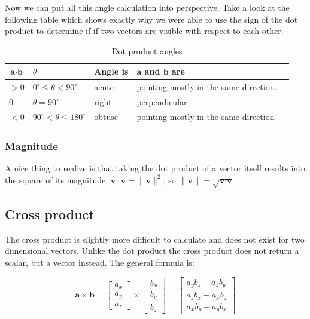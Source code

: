 \documentclass[a4paper,11pt]{article}
\begin{document}
Now we can put all this angle calculation into perspective. Take a look at the following table which shows exactly why we were able to use the sign of the dot product to determine if if two vectors are visible with respect to each other.

\begin{table}[H]
\centering
\begin{tabular}{|l|l|l|l|l|}
\hline
$\textbf{a}\cdot\textbf{b}$ & $\theta$ & \textbf{Angle is} & $\textbf{a}$ \textbf{and} $\textbf{b}$ \textbf{are}  \\ \hline
$>0$ & $0^\circ \leq \theta < 90^\circ$ & acute & pointing mostly in the same direction. \\ \hline
$0$ & $\theta=90^\circ$ & right & perpendicular \\ \hline
$<0$ & $90^\circ < \theta \leq 180^\circ$ & obtuse & pointing mostly in the same direction \\ \hline
\end{tabular}
\caption{Dot product angles}
\label{tab:dot-product-angles}
\end{table}

\subsubsection{Magnitude}

A nice thing to realize is that taking the dot product of a vector itself results into the square of its magnitude: $\textbf{v}\cdot\textbf{v}=\|\textbf{v}\|^2$, so $\|\textbf{v}\|=\sqrt{\textbf{v}\cdot\textbf{v}}$.

\subsection{Cross product}

The cross product is slightly more difficult to calculate and does not exist for two dimensional vectors. Unlike the dot product the cross product does not return a scalar, but a vector instead. The general formula is:

$$
\textbf{a}\times\textbf{b}=
\begin{bmatrix}
a_x \\ a_y \\ a_z
\end{bmatrix}\times
\begin{bmatrix}
b_x \\ b_y \\ b_z
\end{bmatrix}=
\begin{bmatrix}
a_yb_z - a_zb_y \\ a_zb_x - a_xb_z \\ a_xb_y - a_yb_x
\end{bmatrix}
$$
\end{document}
